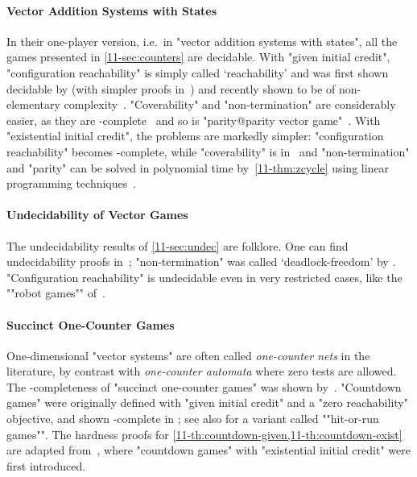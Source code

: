 \paragraph{Vector Addition Systems with States}
In their one-player version, i.e.\ in "vector addition systems with
states", all the games presented in \cref{11-sec:counters} are decidable.
With "given initial credit", "configuration reachability" is simply
called `reachability' and was first shown decidable by
 (with simpler proofs
in~\cite{Kosaraju:1982,Lambert:1992,Leroux:2011}) and recently shown
to be of non-elementary complexity~\cite{Czerwinski&Lasota&Lazic&Leroux&Mazowiecki:2019}.  "Coverability" and
"non-termination" are considerably easier, as they are
\EXPSPACE-complete~\cite{Lipton:1976,Rackoff:1978} and so is
"parity@parity vector game"~\cite{Habermehl:1997}.  With "existential
initial credit", the problems are markedly simpler: "configuration
reachability" becomes \EXPSPACE-complete, while "coverability" is in
\NL\ and "non-termination" and "parity" can be solved in polynomial
time by~\cref{11-thm:zcycle} using linear programming
techniques~\cite{Kosaraju&Sullivan:1988}.

\paragraph{Undecidability of Vector Games}
The undecidability results of \cref{11-sec:undec} are folklore.  One
can find undecidability proofs
in~\cite{Abdulla&Bouajjani&dOrso:2003,Raskin&Samuelides&VanBegin:2005};
"non-termination" was called `deadlock-freedom' by . "Configuration reachability" is
undecidable even in very restricted cases, like the ""robot games""
of~\citet{Niskanen&Potapov&Reichert:2016}.

\paragraph{Succinct One-Counter Games}
One-dimensional "vector systems" are often called \emph{one-counter
nets} in the literature, by contrast with \emph{one-counter automata}
where zero tests are allowed.  The \EXPSPACE-completeness of "succinct
one-counter games" was shown by~.  "Countdown games"
were originally defined with "given initial credit" and a "zero
reachability" objective, and shown
\EXP-complete in \cite{Jurdzinski&Laroussinie&Sproston:2008}; see also
\citet{Kiefer:2013} for a variant called ""hit-or-run games"".  The
hardness proofs for \cref{11-th:countdown-given,11-th:countdown-exist} are
adapted from~\citet{Jancar&Osicka&Sawa:2018}, where "countdown games"
with "existential initial credit" were first introduced.

